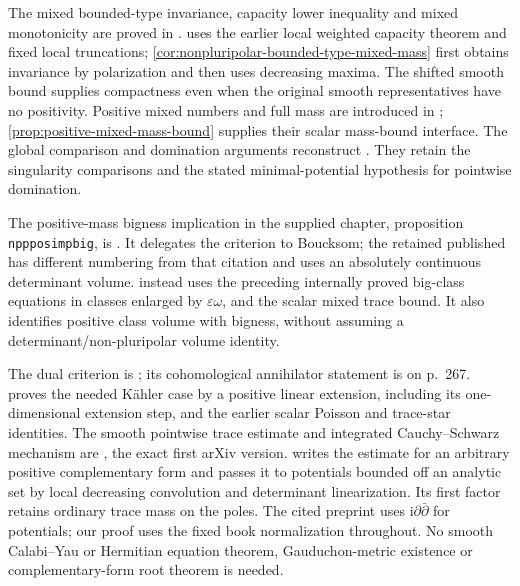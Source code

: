 The mixed bounded-type invariance, capacity lower inequality and mixed monotonicity are proved in \cite[Proposition 2.1, Theorem 2.3 and Theorem 2.4, pp.~2054--2057]{DDNL18mono}.  uses the earlier local weighted capacity theorem and fixed local truncations; \cref{cor:nonpluripolar-bounded-type-mixed-mass} first obtains invariance by polarization and then uses decreasing maxima. The shifted smooth bound supplies compactness even when the original smooth representatives have no positivity. Positive mixed numbers and full mass are introduced in \cite[Definition 1.17, Proposition 1.20 and Definition 1.21, pp.~218--222]{BEGZ10}; \cref{prop:positive-mixed-mass-bound} supplies their scalar mass-bound interface. The global comparison and domination arguments reconstruct \cite[Corollaries 4.1--4.2, pp.~8--9]{WittNystrom2017v1}. They retain the singularity comparisons and the stated minimal-potential hypothesis for pointwise domination.

The positive-mass bigness implication in the supplied chapter, proposition \texttt{nppposimpbig}, is \cite[Proposition 1.22, p.~222]{BEGZ10}. It delegates the criterion to Boucksom; the retained published \cite[Section 4.3, Theorem 4.7, pp.~1057--1061]{Bou02b} has different numbering from that citation and uses an absolutely continuous determinant volume.  instead uses the preceding internally proved big-class equations in classes enlarged by $\varepsilon\omega$, and the scalar mixed trace bound. It also identifies positive class volume with bigness, without assuming a determinant/non-pluripolar volume identity.

The dual criterion is \cite[Lemma 3.3 and complete proof, pp.~275--276]{Lamari1999}; its cohomological annihilator statement is on p.~267.  proves the needed K\"ahler case by a positive linear extension, including its one-dimensional extension step, and the earlier scalar Poisson and trace-star identities. The smooth pointwise trace estimate and integrated Cauchy--Schwarz mechanism are \cite[Lemmas 3.1--3.2 and complete proofs, pp.~4--6]{Popovici2014v1}, the exact first arXiv version.  writes the estimate for an arbitrary positive complementary form and passes it to potentials bounded off an analytic set by local decreasing convolution and determinant linearization. Its first factor retains ordinary trace mass on the poles. The cited preprint uses $\mathrm i\partial\bar\partial$ for potentials; our proof uses the fixed book normalization throughout. No smooth Calabi--Yau or Hermitian equation theorem, Gauduchon-metric existence or complementary-form root theorem is needed.

